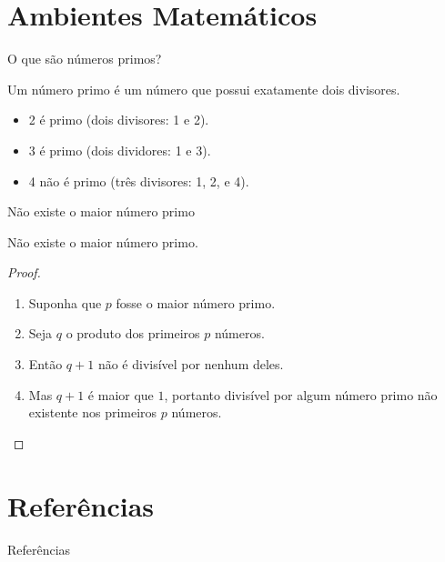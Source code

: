 \documentclass{beamer}
\begin{document}
  \section{Ambientes Matemáticos}
  
  \begin{frame}{O que são números primos?}
    \begin{definition}
      Um \alert{número primo} é um número que possui exatamente dois divisores.
    \end{definition}
    \begin{example}
      \begin{itemize}
      \item 2 é primo (dois divisores: 1 e 2).
      \item 3 é primo (dois dividores: 1 e 3).
      \item 4 não é primo (\alert{três} divisores: 1, 2, e 4).
      \end{itemize}
    \end{example}
  \end{frame}
  
  \begin{frame}{Não existe o maior número primo}
    \begin{theorem}
      Não existe o maior número primo.
    \end{theorem}
    \begin{proof}
      \begin{enumerate}
	\item Suponha que $p$ fosse o maior número primo.
	\item Seja $q$ o produto dos primeiros $p$ números.
	\item Então $q + 1$ não é divisível por nenhum deles.
	\item Mas $q + 1$ é maior que $1$, portanto divisível por algum número primo não existente nos primeiros $p$ números.\qedhere
      \end{enumerate}
    \end{proof}
  \end{frame}
  
  \section{Referências}
  
  \begin{frame}[allowframebreaks]{Referências}
    
  \end{frame}
\end{document}
